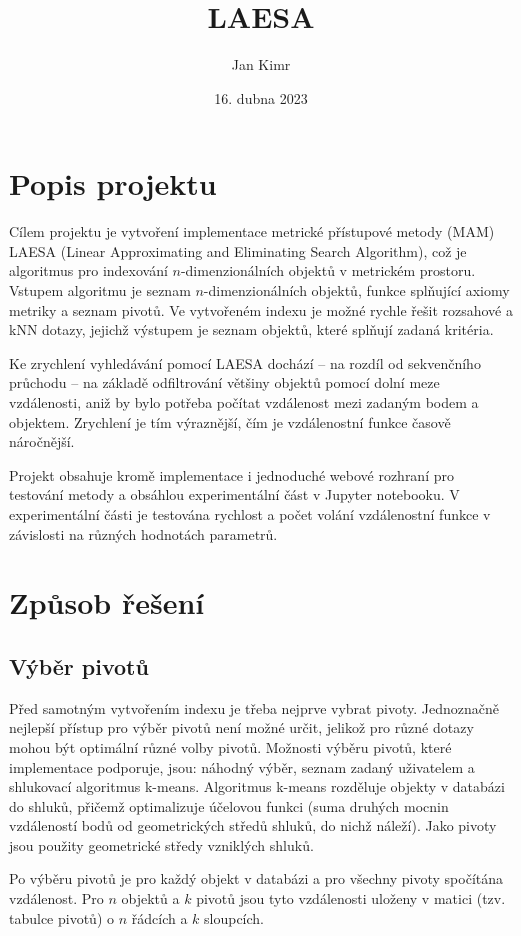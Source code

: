 \documentclass{article}
\title{LAESA}
\author{Jan Kimr}
\date{16. dubna 2023}
\begin{document}
\maketitle

\section{Popis projektu}

Cílem projektu je vytvoření implementace metrické přístupové metody (MAM) LAESA (Linear Approximating and Eliminating Search Algorithm), což je algoritmus pro indexování $n$-dimenzionálních objektů v metrickém prostoru. Vstupem algoritmu je seznam $n$-dimenzionálních objektů, funkce splňující axiomy metriky a seznam pivotů. Ve vytvořeném indexu je možné rychle řešit rozsahové a kNN dotazy, jejichž výstupem je seznam objektů, které splňují zadaná kritéria.

Ke zrychlení vyhledávání pomocí LAESA dochází – na rozdíl od sekvenčního průchodu – na základě odfiltrování většiny objektů pomocí dolní meze vzdálenosti, aniž by bylo potřeba počítat vzdálenost mezi zadaným bodem a objektem. Zrychlení je tím výraznější, čím je vzdálenostní funkce časově náročnější.

Projekt obsahuje kromě implementace i jednoduché webové rozhraní pro testování metody a obsáhlou experimentální část v Jupyter notebooku. V experimentální části je testována rychlost a počet volání vzdálenostní funkce v závislosti na různých hodnotách parametrů.

\section{Způsob řešení}
\subsection{Výběr pivotů}
Před samotným vytvořením indexu je třeba nejprve vybrat pivoty. Jednoznačně nejlepší přístup pro výběr pivotů není možné určit, jelikož pro různé dotazy mohou být optimální různé volby pivotů. Možnosti výběru pivotů, které implementace podporuje, jsou: náhodný výběr, seznam zadaný uživatelem a shlukovací algoritmus k-means. Algoritmus k-means rozděluje objekty v databázi do shluků, přičemž optimalizuje účelovou funkci (suma druhých mocnin vzdáleností bodů od geometrických středů shluků, do nichž náleží). Jako pivoty jsou použity geometrické středy vzniklých shluků.

Po výběru pivotů je pro každý objekt v databázi a pro všechny pivoty spočítána vzdálenost. Pro $n$ objektů a $k$ pivotů jsou tyto vzdálenosti uloženy v matici (tzv. tabulce pivotů) o $n$ řádcích a $k$ sloupcích.
\end{document}
